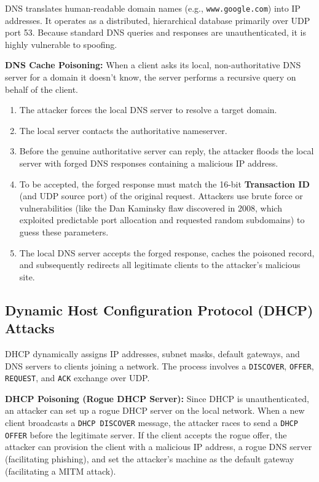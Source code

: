 DNS translates human-readable domain names (e.g., \texttt{www.google.com}) into IP addresses. It operates as a distributed, hierarchical database primarily over UDP port 53. Because standard DNS queries and responses are unauthenticated, it is highly vulnerable to spoofing.

\textbf{DNS Cache Poisoning:}
When a client asks its local, non-authoritative DNS server for a domain it doesn't know, the server performs a recursive query on behalf of the client. 
\begin{enumerate}
    \item The attacker forces the local DNS server to resolve a target domain.
    \item The local server contacts the authoritative nameserver.
    \item Before the genuine authoritative server can reply, the attacker floods the local server with forged DNS responses containing a malicious IP address.
    \item To be accepted, the forged response must match the 16-bit \textbf{Transaction ID} (and UDP source port) of the original request. Attackers use brute force or vulnerabilities (like the Dan Kaminsky flaw discovered in 2008, which exploited predictable port allocation and requested random subdomains) to guess these parameters.
    \item The local DNS server accepts the forged response, caches the poisoned record, and subsequently redirects all legitimate clients to the attacker's malicious site.
\end{enumerate}

\subsection{Dynamic Host Configuration Protocol (DHCP) Attacks}
DHCP dynamically assigns IP addresses, subnet masks, default gateways, and DNS servers to clients joining a network. The process involves a \texttt{DISCOVER}, \texttt{OFFER}, \texttt{REQUEST}, and \texttt{ACK} exchange over UDP.

\textbf{DHCP Poisoning (Rogue DHCP Server):}
Since DHCP is unauthenticated, an attacker can set up a rogue DHCP server on the local network. When a new client broadcasts a \texttt{DHCP DISCOVER} message, the attacker races to send a \texttt{DHCP OFFER} before the legitimate server. If the client accepts the rogue offer, the attacker can provision the client with a malicious IP address, a rogue DNS server (facilitating phishing), and set the attacker's machine as the default gateway (facilitating a MITM attack).

